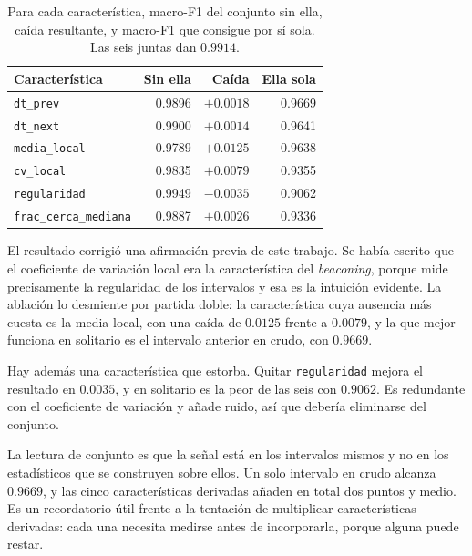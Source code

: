 \begin{table}[htbp]
  \centering
  \caption[Ablación de las características de inter-arribo]{Para cada
  característica, macro-F1 del conjunto sin ella, caída resultante, y macro-F1
  que consigue por sí sola. Las seis juntas dan $0.9914$.}
  \label{tab:ablacion-inter}
  \begin{tabular}{lrrr}
    \toprule
    \textbf{Característica} & \textbf{Sin ella} & \textbf{Caída} & \textbf{Ella sola} \\
    \midrule
    \texttt{dt\_prev}            & 0.9896 & $+0.0018$ & 0.9669 \\
    \texttt{dt\_next}            & 0.9900 & $+0.0014$ & 0.9641 \\
    \texttt{media\_local}        & 0.9789 & $+0.0125$ & 0.9638 \\
    \texttt{cv\_local}           & 0.9835 & $+0.0079$ & 0.9355 \\
    \texttt{regularidad}         & 0.9949 & $-0.0035$ & 0.9062 \\
    \texttt{frac\_cerca\_mediana} & 0.9887 & $+0.0026$ & 0.9336 \\
    \bottomrule
  \end{tabular}
\end{table}

El resultado corrigió una afirmación previa de este trabajo. Se había escrito que
el coeficiente de variación local era la característica del \emph{beaconing},
porque mide precisamente la regularidad de los intervalos y esa es la intuición
evidente. La ablación lo desmiente por partida doble: la característica cuya
ausencia más cuesta es la media local, con una caída de $0.0125$ frente a
$0.0079$, y la que mejor funciona en solitario es el intervalo anterior en
crudo, con $0.9669$.

Hay además una característica que estorba. Quitar \texttt{regularidad} mejora el
resultado en $0.0035$, y en solitario es la peor de las seis con $0.9062$.
Es redundante con el coeficiente de variación y añade ruido, así que debería
eliminarse del conjunto.

La lectura de conjunto es que la señal está en los intervalos mismos y no en los
estadísticos que se construyen sobre ellos. Un solo intervalo en crudo alcanza
$0.9669$, y las cinco características derivadas añaden en total dos puntos y
medio. Es un recordatorio útil frente a la tentación de multiplicar
características derivadas: cada una necesita medirse antes de
incorporarla, porque alguna puede restar.

